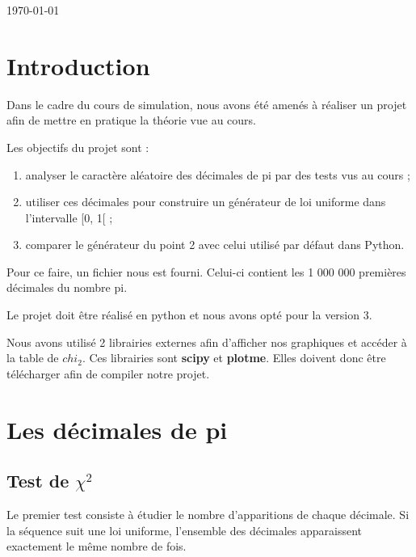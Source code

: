 \documentclass[10pt,a4paper]{article}
\begin{document}
\begin{titlepage}
\begin{center}
			\vfill
			
			{\large \today}
			
		\end{center}
	\end{titlepage}
	
	\newpage
	\tableofcontents
	
	\newpage
	\section{Introduction}
	Dans le cadre du cours de simulation, nous avons été amenés à réaliser un projet afin de mettre en pratique la théorie vue au cours.
	
	Les objectifs du projet sont :
	\begin{enumerate}
		\item analyser le caractère aléatoire des décimales de pi par des tests vus au cours ;
		\item utiliser ces décimales pour construire un générateur de loi uniforme dans l'intervalle [0, 1[ ;
		\item comparer le générateur du point 2 avec celui utilisé par défaut dans Python.
	\end{enumerate}
	
	Pour ce faire, un fichier nous est fourni. Celui-ci contient les 1 000 000 premières décimales du nombre pi.
	
	Le projet doit être réalisé en python et nous avons opté pour la version 3.

	Nous avons utilisé 2 librairies externes afin d'afficher nos graphiques et accéder à la table de $chi_2$. Ces librairies sont \textbf{scipy} et \textbf{plotme}. Elles doivent donc être télécharger afin de compiler notre projet. %
	
	\newpage
	\section{Les décimales de pi}
	
	\subsection{Test de $\chi^2$}
	Le premier test consiste à étudier le nombre d'apparitions de chaque décimale. Si la séquence suit une loi uniforme, l'ensemble des décimales apparaissent exactement le même nombre de fois.
	
\end{document}

